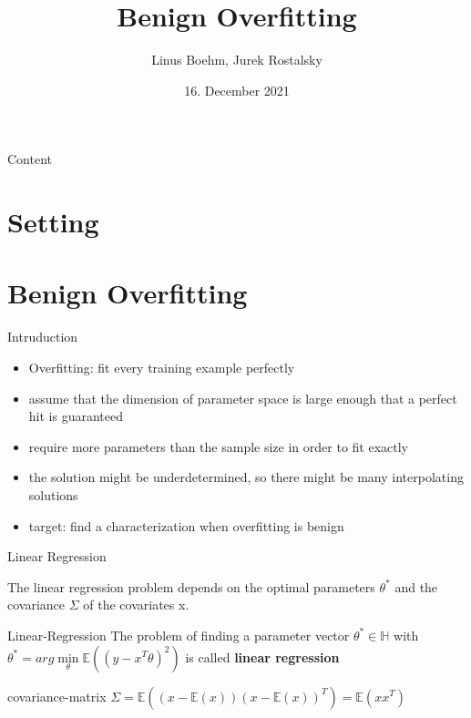 \documentclass{beamer}
\title{Benign Overfitting}
\date{16. December 2021}
\author{Linus Boehm, Jurek Rostalsky}
\begin{document}
\maketitle

\begin{frame}{Content}
\tableofcontents
\end{frame}

\section{Setting}
\section{Benign Overfitting}

\begin{frame}{Intruduction}
\begin{itemize}
	\item Overfitting: fit every training example perfectly
	\item assume that the dimension of parameter space is large enough that a perfect hit is guaranteed 
	\item require more parameters than the sample size in order to fit exactly
	\item the solution might be underdetermined, so there might be many interpolating solutions
	\item target: find a characterization when overfitting is benign
\end{itemize}
\end{frame}


\begin{frame}{Linear Regression}
	
The linear regression problem depends on the optimal parameters $\theta^*$ and the covariance $\Sigma$ of the covariates x.

\begin{center}
\begin{block}{Linear-Regression}
The problem of finding a parameter vector \(\theta^\ast \in \mathbb{H}\) with 
$\theta^\ast = arg \min\limits_\theta \mathbb{E}\left((y - x^T \theta)^2\right)$
is called \textbf{linear regression}
\end{block}
\begin{block}{covariance-matrix}
$\Sigma = \mathbb{E}\left(\left(x - \mathbb{E}(x)\right)\left(x - \mathbb{E}(x)\right)^T\right) =  \mathbb{E}(xx^T)$
\end{block}
\end{center}
\end{frame}
\end{document}
